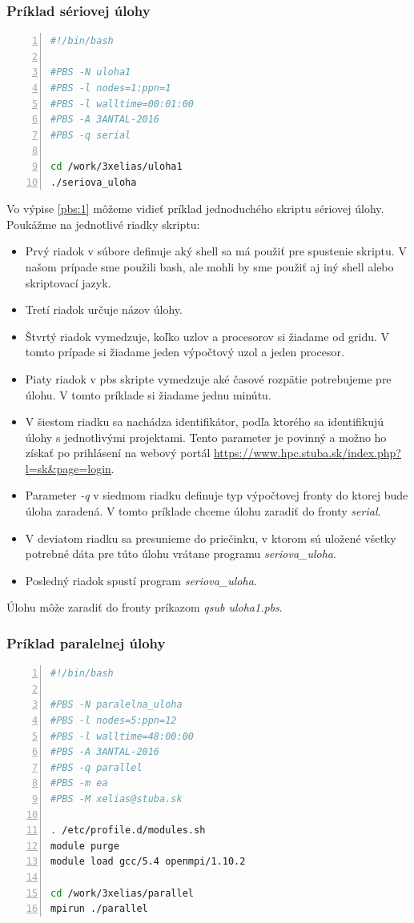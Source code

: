 \subsubsection{Príklad sériovej úlohy}

\begin{lstlisting}[language=bash, caption={uloha1.pbs}, label={pbs:1}, numbers=left]
#!/bin/bash

#PBS -N uloha1
#PBS -l nodes=1:ppn=1
#PBS -l walltime=00:01:00  
#PBS -A 3ANTAL-2016
#PBS -q serial

cd /work/3xelias/uloha1
./seriova_uloha
\end{lstlisting}

Vo výpise \ref{pbs:1} môžeme vidieť príklad jednoduchého skriptu sériovej úlohy.
Poukážme na jednotlivé riadky skriptu:
\begin{itemize}
\item
  Prvý riadok v súbore definuje aký shell sa má použiť pre spustenie skriptu.
  V našom prípade sme použili \acrshort{bash}, ale mohli by sme použiť aj iný shell alebo skriptovací jazyk.
\item
  Tretí riadok určuje názov úlohy.
\item
  Štvrtý riadok vymedzuje, koľko uzlov a procesorov si žiadame od gridu.
  V tomto prípade si žiadame jeden výpočtový uzol a jeden procesor.
\item
  Piaty riadok v \acrshort{pbs} skripte vymedzuje aké časové rozpätie potrebujeme pre úlohu.
  V tomto príklade si žiadame jednu minútu.
\item
  V šiestom riadku sa nachádza identifikátor, podľa ktorého sa identifikujú úlohy s jednotlivými projektami.
  Tento parameter je povinný a možno ho získať po prihlásení na webový portál \url{https://www.hpc.stuba.sk/index.php?l=sk&page=login}.
\item
  Parameter \textit{-q} v siedmom riadku definuje typ výpočtovej fronty do ktorej bude úloha zaradená.
  V tomto príklade chceme úlohu zaradiť do fronty \textit{serial}.
\item
  V deviatom riadku sa presunieme do priečinku, v ktorom sú uložené všetky potrebné dáta pre túto úlohu vrátane programu \textit{seriova\_uloha}.
\item
  Posledný riadok spustí program \textit{seriova\_uloha}.
\end{itemize}
Úlohu môže zaradiť do fronty príkazom \textit{qsub uloha1.pbs}.

\subsubsection{Príklad paralelnej úlohy}
\begin{lstlisting}[language=bash, caption={uloha2.pbs}, label={pbs:2}, numbers=left]
#!/bin/bash

#PBS -N paralelna_uloha
#PBS -l nodes=5:ppn=12
#PBS -l walltime=48:00:00  
#PBS -A 3ANTAL-2016
#PBS -q parallel
#PBS -m ea
#PBS -M xelias@stuba.sk

. /etc/profile.d/modules.sh
module purge
module load gcc/5.4 openmpi/1.10.2

cd /work/3xelias/parallel
mpirun ./parallel
\end{lstlisting}


